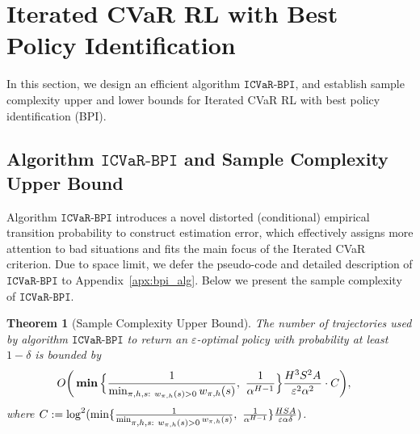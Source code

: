 \documentclass{article} %
\newtheorem{theorem}{Theorem}
\newcommand{\algcvarbpi}{\mathtt{ICVaR\mbox{-}BPI}}
\newcommand{\revision}[1]{{\color{black} #1}}
\begin{document}
	\vspace*{-0.2em}
	\section{Iterated CVaR RL with Best Policy Identification}
	In this section, we design an efficient algorithm $\algcvarbpi$, and establish sample complexity upper and lower bounds for Iterated CVaR RL with best policy identification (BPI). %
	
	\vspace*{-0.2em}
	\subsection{Algorithm $\algcvarbpi$ and Sample Complexity Upper Bound}
	
	\revision{Algorithm $\algcvarbpi$ introduces a novel distorted (conditional) empirical transition probability to construct estimation error, which effectively assigns more attention to bad situations and  fits the main focus of the Iterated CVaR criterion.} Due to space limit, we defer the pseudo-code and detailed description of $\algcvarbpi$ to Appendix~\ref{apx:bpi_alg}.
	Below we present the sample complexity of $\algcvarbpi$.
	
	\begin{theorem} [Sample Complexity Upper Bound] \label{thm:bpi_ub}
		The number of trajectories used by 
		algorithm $\algcvarbpi$ to return an $\varepsilon$-optimal policy with probability at least $1-\delta$ is bounded by
		\begin{align*}
			O \bigg( & \bm{\min} \Big\{\frac{ 1 }{\min_{\begin{subarray}{c}\pi,h,s:\  w_{\pi,h}(s)>0\end{subarray}} w_{\pi,h}(s)},\ \frac{1}{\alpha^{H-1}} \Big\} \frac{ H^3 S^2 A}{\varepsilon^2 \alpha^2 } \cdot C \bigg) ,
		\end{align*}
		where $C:=\log^2 ( \min \{\frac{ 1 }{\min_{\begin{subarray}{c}\pi,h,s:\  w_{\pi,h}(s)>0\end{subarray}} w_{\pi,h}(s)},\ \frac{1}{\alpha^{H-1}} \} \frac{HSA}{ \varepsilon \alpha \delta } )$.
	\end{theorem}
	
\end{document}
